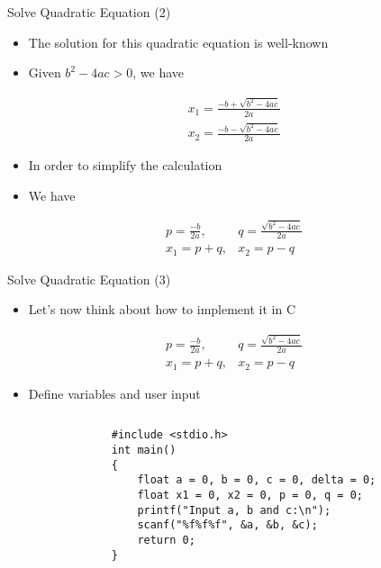 \begin{frame}[fragile]{Solve Quadratic Equation (2)}
\begin{itemize}
	\item {The solution for this quadratic equation is well-known}
	\item {Given $b^2-4ac > 0$, we have}
\end{itemize}
\begin{eqnarray}
x_1=\frac{-b+\sqrt{b^2-4ac}}{2a} \nonumber \\
x_2=\frac{-b-\sqrt{b^2-4ac}}{2a} \nonumber 
\end{eqnarray}
\begin{itemize}
	\item {In order to simplify the calculation}
	\item {We have}
\end{itemize}
\begin{eqnarray}
p=\frac{-b}{2a}, & q=\frac{\sqrt{b^2-4ac}}{2a} \nonumber \\
x_1=p+q, & x_2=p-q \nonumber 
\end{eqnarray}

\end{frame}

\begin{frame}[fragile]{Solve Quadratic Equation (3)}
\begin{itemize}
	\item {Let's now think about how to implement it in C}
\end{itemize}
\begin{eqnarray}
p=\frac{-b}{2a}, & q=\frac{\sqrt{b^2-4ac}}{2a} \nonumber \\
x_1=p+q, & x_2=p-q \nonumber
\end{eqnarray}
	\begin{itemize}
		\item {Define variables and user input}
	\end{itemize}
\vspace{-0.25in}
	\begin{columns}
		\begin{column}{0.1\linewidth}
		\end{column}
		\begin{column}{0.9\linewidth}
	\begin{lstlisting}[]
#include <stdio.h>
int main()
{
    float a = 0, b = 0, c = 0, delta = 0;
    float x1 = 0, x2 = 0, p = 0, q = 0;
    printf("Input a, b and c:\n");
    scanf("%f%f%f", &a, &b, &c);
    return 0;
}
	\end{lstlisting}
	\end{column}
	\end{columns}
\end{frame}

